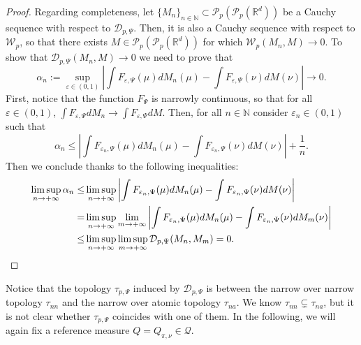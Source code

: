 \documentclass[10pt,leqno]{amsart}
\numberwithin{equation}{section}
\newcommand{\R}{\mathbb{R}}
\newcommand{\Q}{\mathbb{Q}}
\newcommand{\N}{\mathbb{N}}
\newcommand{\PP}{\mathcal{P}}
\renewcommand{\Q}{Q}
\begin{document}
\begin{proof}
    Regarding completeness, let $\{M_n\}_{n\in \N} \subset \PP_p(\PP_p(\R^d))$ be a Cauchy sequence with respect to $\mathcal{D}_{p,\Psi}$. Then, it is also a Cauchy sequence with respect to $\mathcal{W}_p$, so that there exists $M\in \PP_p(\PP_p(\R^d))$ for which $\mathcal{W}_p(M_n,M)\to 0$. To show that $\mathcal{D}_{p,\Psi}(M_n,M)\to 0$ we need to prove that 
    \[\alpha_n:= \sup_{\varepsilon\in(0,1)} \left| \int F_{\varepsilon,\Psi}(\mu) dM_n(\mu) - \int F_{\varepsilon,\Psi}(\nu) dM(\nu) \right| \to 0.\]
    First, notice that the function $F_\Psi$ is narrowly continuous, so that for all $\varepsilon\in(0,1)$, $\int F_{\varepsilon,\Psi}dM_n \to \int F_{\varepsilon,\Psi} dM$. Then, for all $n\in \N$ consider $\varepsilon_n\in(0,1)$ such that 
    \[\alpha_n \leq \left| \int F_{\varepsilon_n,\Psi}(\mu) dM_n(\mu) - \int F_{\varepsilon_n,\Psi}(\nu) dM(\nu) \right| + \frac{1}{n}.\]
    Then we conclude thanks to the following inequalities:
    \begin{align*}
        \limsup_{n\to +\infty} \alpha_n \leq & \limsup_{n\to+\infty} \left| \int F_{\varepsilon_n,\Psi}(\mu) dM_n(\mu) - \int F_{\varepsilon_n,\Psi}(\nu) dM(\nu) \right|
        \\
        = & \limsup_{n\to +\infty} \lim_{m\to+\infty} \left| \int F_{\varepsilon_n,\Psi}(\mu) dM_n(\mu) - \int F_{\varepsilon_n,\Psi}(\nu) dM_m(\nu) \right|
        \\
        \leq & \limsup_{n\to +\infty} \limsup_{m\to+\infty} \mathcal{D}_{p,\Psi}(M_n,M_m) = 0. \qedhere
    \end{align*}
\end{proof}

Notice that the topology $\tau_{p,\Psi}$ induced by $\mathcal{D}_{p,\Psi}$ is between the narrow over narrow topology $\tau_{nn}$ and the narrow over atomic topology $\tau_{na}$. We know $\tau_{nn} \subsetneq \tau_{na}$, but it is not clear whether $\tau_{p,\Psi}$ coincides with one of them.
In the following, we will again fix a reference measure $\Q = \Q_{\pi,\nu} \in \mathcal{Q}$.
\end{document}
